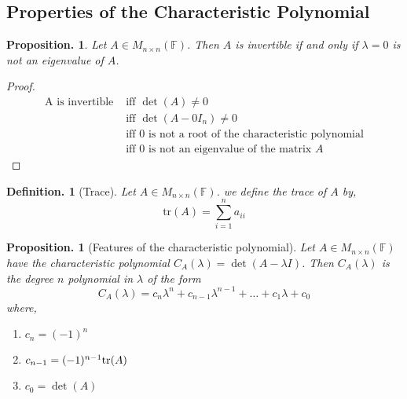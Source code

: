 \documentclass[11pt, a4paper]{memoir}
\theoremstyle{change}
\newtheorem{proposition}[theorem]{Proposition.}
\theoremstyle{plain}
\theoremstyle{nonumberplain}
\newtheorem{definition}{Definition.}
\newtheorem{proof}{Proof}
\numberwithin{equation}{section}
\begin{document}
\subsection{Properties of the Characteristic Polynomial}
\begin{proposition}
    Let $A \in M_{n \times n}(\mathbb{F})$. Then $A$ is invertible if and only if $\lambda = 0$ is not an eigenvalue of $A$.
\end{proposition}
\begin{proof}
    \begin{align*}
        \text{A is invertible } 
        &\text{iff }\det(A) \ne 0\\
        &\text{iff }\det(A - 0I_n) \ne 0\\
        &\text{iff }0 \text{ is not a root of the characteristic polynomial}\\
        &\text{iff } 0 \text{ is not an eigenvalue of the matrix } A
    \end{align*}
\end{proof}
\begin{definition}[Trace]
  Let $A \in M_{n \times n}(\mathbb{F})$. we define the trace of $A$ by, $$\text{tr}(A) = \sum^n_{i=1}a_{ii}$$
\end{definition}
\begin{proposition}[Features of the characteristic polynomial]
  Let $A \in M_{n \times n}(\mathbb{F})$ have the characteristic polynomial $C_A(\lambda) = \det(A - \lambda I)$. Then $C_A(\lambda)$ is the degree $n$ polynomial in $\lambda $ of the form
  $$C_A(\lambda) = c_n\lambda^n + c_{n-1}\lambda^{n-1} + \dots + c_1\lambda + c_0$$
  where, 
  \begin{enumerate}
    \item $c_n = (-1)^n$
    \item $c_{n-1} = (-1)^{n-1}\space \text{tr}(A)$
    \item $c_0 = \det(A)$
  \end{enumerate}
\end{proposition}
\end{document}
